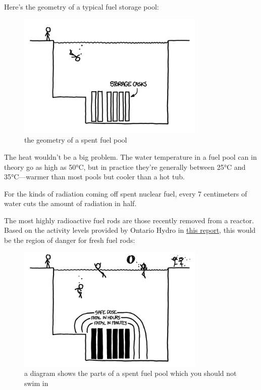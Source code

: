 {Here’s the geometry of a typical fuel storage pool:}

\begin{figure}[!htbp]
\centering
\includegraphics[scale=0.5, max width=0.8\textwidth]{imgs/a/29/pool_geometry.png}
\caption{the geometry of a spent fuel pool}
\end{figure}

{The heat wouldn't be a big problem. The water temperature in a fuel pool can in theory go as high as 50°C, but in practice they're generally between 25°C and 35°C—warmer than most pools but cooler than a hot tub.}

{For the kinds of radiation coming off spent nuclear fuel, every 7 centimeters of water cuts the amount of radiation in half.}

{The most highly radioactive fuel rods are those recently removed from a reactor. Based on the activity levels provided by Ontario Hydro in \href{http://www.osti.gov/energycitations/servlets/purl/7284014-xaMii9/7284014.pdf}{this report}, this would be the region of danger for fresh fuel rods:}

\begin{figure}[!htbp]
\centering
\includegraphics[scale=0.5, max width=0.8\textwidth]{imgs/a/29/pool_danger.png}
\caption{a diagram shows the parts of a spent fuel pool which you should not swim in}
\end{figure}

